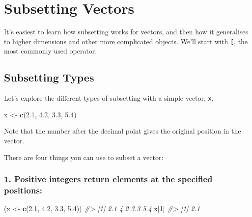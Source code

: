 \documentclass[]{book}
\newenvironment{Shaded}{\begin{snugshade}}{\end{snugshade}}
\newcommand{\KeywordTok}[1]{\textcolor[rgb]{0.13,0.29,0.53}{\textbf{#1}}}
\newcommand{\DecValTok}[1]{\textcolor[rgb]{0.00,0.00,0.81}{#1}}
\newcommand{\FloatTok}[1]{\textcolor[rgb]{0.00,0.00,0.81}{#1}}
\newcommand{\StringTok}[1]{\textcolor[rgb]{0.31,0.60,0.02}{#1}}
\newcommand{\CommentTok}[1]{\textcolor[rgb]{0.56,0.35,0.01}{\textit{#1}}}
\newcommand{\NormalTok}[1]{#1}
\begin{document}
\section{Subsetting Vectors}\label{subsetting-vectors}

It's easiest to learn how subsetting works for vectors, and then how it
generalises to higher dimensions and other more complicated objects.
We'll start with \texttt{{[}}, the most commonly used operator.

\subsection{Subsetting Types}\label{subsetting-types}

Let's explore the different types of subsetting with a simple vector,
\texttt{x}.

\begin{Shaded}
\begin{Highlighting}[]
\NormalTok{x <-}\StringTok{ }\KeywordTok{c}\NormalTok{(}\FloatTok{2.1}\NormalTok{, }\FloatTok{4.2}\NormalTok{, }\FloatTok{3.3}\NormalTok{, }\FloatTok{5.4}\NormalTok{)}
\end{Highlighting}
\end{Shaded}

Note that the number after the decimal point gives the original position
in the vector.

There are four things you can use to subset a vector:

\subsubsection*{\texorpdfstring{1. \textbf{Positive integers} return
elements at the specified
positions:}{1. Positive integers return elements at the specified positions:}}\label{positive-integers-return-elements-at-the-specified-positions}

\begin{Shaded}
\begin{Highlighting}[]
\NormalTok{(x <-}\StringTok{ }\KeywordTok{c}\NormalTok{(}\FloatTok{2.1}\NormalTok{, }\FloatTok{4.2}\NormalTok{, }\FloatTok{3.3}\NormalTok{, }\FloatTok{5.4}\NormalTok{))}
\CommentTok{#> [1] 2.1 4.2 3.3 5.4}
\NormalTok{x[}\DecValTok{1}\NormalTok{]}
\CommentTok{#> [1] 2.1}
\end{Highlighting}
\end{Shaded}
\end{document}
